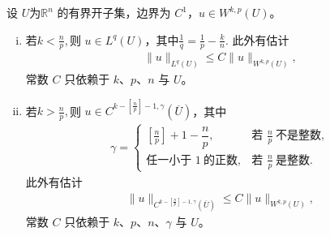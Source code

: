 \documentclass[../../main.tex]{subfiles}
\begin{document}
\begin{theorem}[一般的Sobolev不等式]\label{theorem:ch05-一般Sobolev不等式}设 $U$为$\mathbb{R}^{n}$ 的有界开子集，边界为 $C^{1}$，$u\in W^{k,p}(U)$。
\begin{enumerate}[(i)]
\item 若$k<\frac{n}{p},$则 $u\in L^{q}(U)$，其中$\frac{1}{q}=\frac{1}{p}-\frac{k}{n}.$
此外有估计
\begin{align}\label{eq::::--328393838382349892jsdjsu}
\|u\|_{L^{q}(U)}\leqslant C\|u\|_{W^{k,p}(U)},
\end{align}
常数 $C$ 只依赖于 $k$、$p$、$n$ 与 $U$。
\item 若$k>\frac{n}{p},$则 $u\in C^{k-\left[\frac{n}{p}\right]-1,\gamma}(\overline{U})$，其中
\begin{align*}
\gamma=
\begin{cases}
\left[\frac{n}{p}\right]+1-\dfrac{n}{p}, & \text{若 } \frac{n}{p}\ \text{不是整数},\\
\text{任一小于 }1\ \text{的正数}, & \text{若 } \frac{n}{p}\ \text{是整数}.
\end{cases}
\end{align*}
此外有估计
\begin{align*}
\|u\|_{C^{k-\left[\frac{n}{p}\right]-1,\gamma}(\overline{U})}\leqslant C\|u\|_{W^{k,p}(U)},
\end{align*}
常数 $C$ 只依赖于 $k$、$p$、$n$、$\gamma$ 与 $U$。
\end{enumerate}
\end{theorem}
\end{document}
